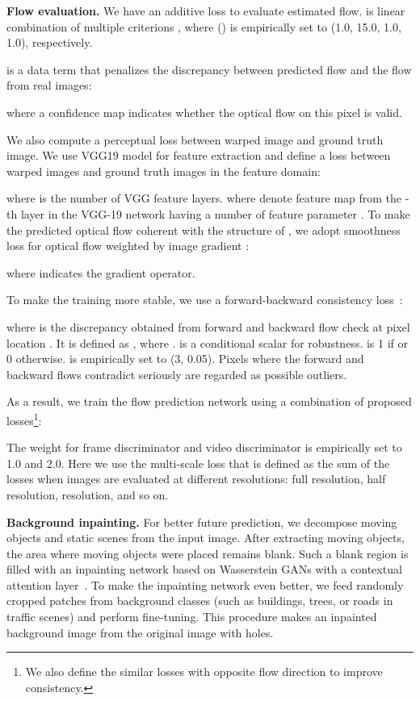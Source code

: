 \documentclass[10pt,twocolumn,letterpaper]{article}
\begin{document}
\vspace{2mm}
\noindent\textbf{Flow evaluation.}
We have an additive loss  to evaluate estimated flow.
 is linear combination of multiple criterions , where () is empirically set to (1.0, 15.0, 1.0, 1.0), respectively.


 is a data term that penalizes the discrepancy between predicted flow and the flow from real images:

where a confidence map  indicates whether the optical flow on this pixel is valid. 

We also compute a perceptual loss between warped image and ground truth image. We use VGG19 model \cite{vgg} for feature extraction and define a  loss between warped images and ground truth images in the feature domain:

where  is the number of VGG feature layers. where  denote feature map from the -th layer in the VGG-19 network having a number of feature parameter .
To make the predicted optical flow coherent with the structure of , we adopt smoothness loss for optical flow weighted by image gradient :

where  indicates the gradient operator. 

To make the training more stable, we use a forward-backward consistency loss~\cite{yin2018geonet}:

where  is the discrepancy obtained from forward and backward flow check at pixel location . It is defined as , where . 
 is a conditional scalar for robustness.  is 1 if  or 0 otherwise.  is empirically set to (3, 0.05). 
Pixels where the forward and backward flows contradict seriously are regarded as possible outliers.

As a result, we train the flow prediction network using a combination of proposed losses\footnote{We also define the similar losses with opposite flow direction to improve consistency.}:

The weight for frame discriminator  and video discriminator  is empirically set to 1.0 and 2.0. Here we use the multi-scale loss that is defined as the sum of the losses when images are evaluated at different resolutions: full resolution, half resolution,   resolution, and so on.

\vspace{2mm}
\noindent\textbf{Background inpainting.}
For better future prediction, we decompose moving objects and static scenes from the input image. After extracting moving objects, the area where moving objects were placed remains blank. Such a blank region is filled with an inpainting network based on Wasserstein GANs with a contextual attention layer~\cite{yu2018generative}. To make the inpainting network even better, we feed randomly cropped patches from background classes (such as buildings, trees, or roads in traffic scenes) and perform fine-tuning. This procedure makes an inpainted background image  from the original image with holes.
\end{document}
